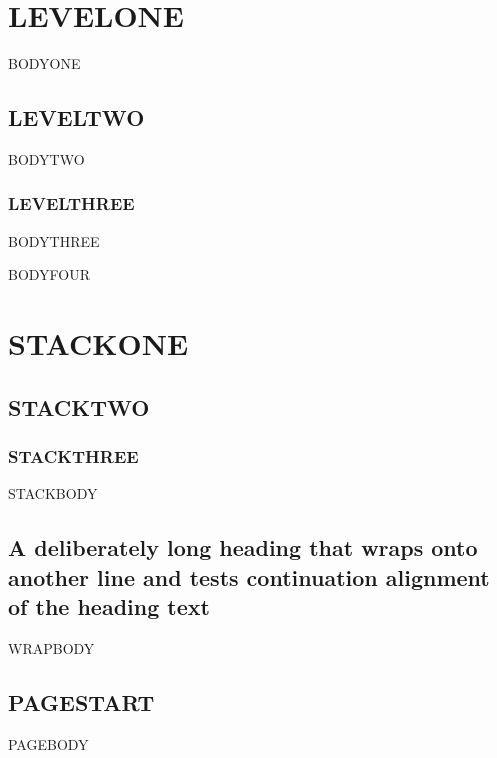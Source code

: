 \documentclass[english,53.01]{proposal}
\begin{document}
\section{LEVELONE}
BODYONE\par
\subsection{LEVELTWO}
BODYTWO\par
\subsubsection{LEVELTHREE}
BODYTHREE\par
{}
BODYFOUR\par
\section{STACKONE}
\subsection{STACKTWO}
\subsubsection{STACKTHREE}
STACKBODY\par
\subsection{A deliberately long heading that wraps onto another line and tests continuation alignment of the heading text}
WRAPBODY\par
\newpage
\subsection{PAGESTART}
PAGEBODY\par
\end{document}
